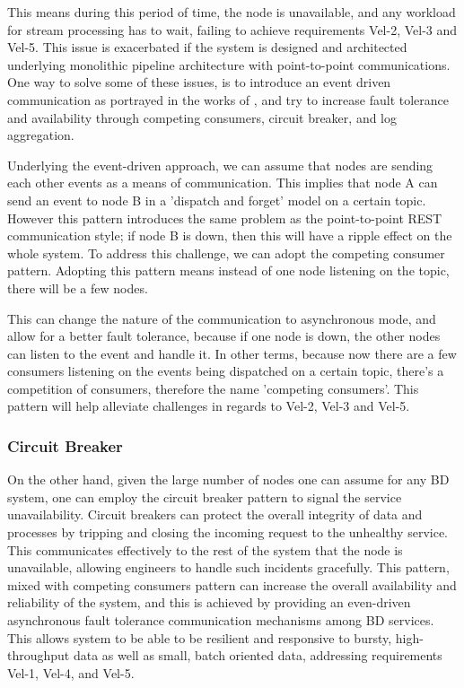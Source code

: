 \documentclass[a4paper,11pt,article,oneside]{memoir}
\begin{document}
This means during this period of time, the node is unavailable, and any workload for stream processing has to wait, failing to achieve requirements Vel-2, Vel-3 and Vel-5. This issue is exacerbated if the system is designed and architected underlying monolithic pipeline architecture with point-to-point communications. One way to solve some of these issues, is to introduce an event driven communication as portrayed in the works of \citet{ataei2021neomycelia}, and try to increase fault tolerance and availability through competing consumers, circuit breaker, and log aggregation. 

Underlying the event-driven approach, we can assume that nodes are sending each other events as a means of communication. This implies that node A can send an event to node B in a 'dispatch and forget' model on a certain topic. However this pattern introduces the same problem as the point-to-point REST communication style; if node B is down, then this will have a ripple effect on the whole system. To address this challenge, we can adopt the competing consumer pattern. Adopting this pattern means instead of one node listening on the topic, there will be a few nodes. 

This can change the nature of the communication to asynchronous mode, and allow for a better fault tolerance, because if one node is down, the other nodes can listen to the event and handle it. In other terms, because now there are a few consumers listening on the events being dispatched on a certain topic, there's a competition of consumers, therefore the name 'competing consumers'. This pattern will help alleviate challenges in regards to Vel-2, Vel-3 and Vel-5. 

\subsubsection{Circuit Breaker}

On the other hand, given the large number of nodes one can assume for any BD system, one can employ the circuit breaker pattern to signal the service unavailability. Circuit breakers can protect the overall integrity of data and processes by tripping and closing the incoming request to the unhealthy service. This communicates effectively to the rest of the system that the node is unavailable, allowing engineers to handle such incidents gracefully. This pattern, mixed with competing consumers pattern can increase the overall availability and reliability of the system, and this is achieved by providing an even-driven asynchronous fault tolerance communication mechanisms among BD services. This allows system to be able to be resilient and responsive to bursty, high-throughput data as well as small, batch oriented data, addressing requirements Vel-1, Vel-4, and Vel-5. 
    
\end{document}
